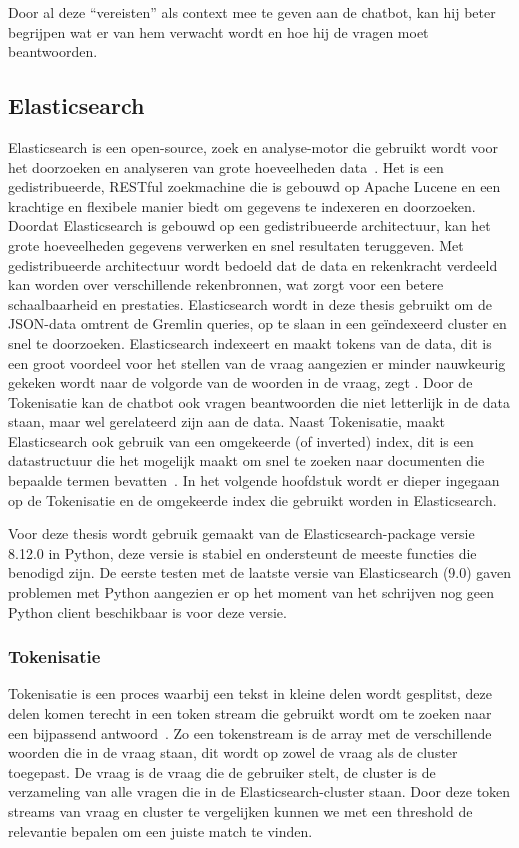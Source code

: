 Door al deze ``vereisten'' als context mee te geven aan de chatbot, kan hij beter begrijpen wat er van hem verwacht wordt en hoe hij de vragen moet beantwoorden.

\subsection{Elasticsearch}\label{sec:Elasticsearch}
Elasticsearch is een open-source, zoek en analyse-motor die gebruikt wordt voor het doorzoeken en analyseren van grote hoeveelheden data~\autocite{Elastic2025}.
Het is een gedistribueerde, RESTful zoekmachine die is gebouwd op Apache Lucene en een krachtige en flexibele manier biedt om gegevens te indexeren en doorzoeken.
Doordat Elasticsearch is gebouwd op een gedistribueerde architectuur, kan het grote hoeveelheden gegevens verwerken en snel resultaten teruggeven.
Met gedistribueerde architectuur wordt bedoeld dat de data en rekenkracht verdeeld kan worden over verschillende rekenbronnen, wat zorgt voor een betere schaalbaarheid en prestaties.
Elasticsearch wordt in deze thesis gebruikt om de JSON-data omtrent de Gremlin queries, op te slaan in een geïndexeerd cluster en snel te doorzoeken.
Elasticsearch indexeert en maakt tokens van de data, dit is een groot voordeel voor het stellen van de vraag aangezien er minder nauwkeurig gekeken wordt naar de volgorde van de woorden in de vraag, zegt \textcite{Oers2025}.
Door de Tokenisatie kan de chatbot ook vragen beantwoorden die niet letterlijk in de data staan, maar wel gerelateerd zijn aan de data.
Naast Tokenisatie, maakt Elasticsearch ook gebruik van een omgekeerde (of inverted) index, dit is een datastructuur die het mogelijk maakt om snel te zoeken naar documenten die bepaalde termen bevatten~\autocite{Brimley2023}.
In het volgende hoofdstuk wordt er dieper ingegaan op de Tokenisatie en de omgekeerde index die gebruikt worden in Elasticsearch.

Voor deze thesis wordt gebruik gemaakt van de Elasticsearch-package versie 8.12.0 in Python, deze versie is stabiel en ondersteunt de meeste functies die benodigd zijn.
De eerste testen met de laatste versie van Elasticsearch (9.0) gaven problemen met Python aangezien er op het moment van het schrijven nog geen Python client beschikbaar is voor deze versie.

\subsubsection{Tokenisatie}
Tokenisatie is een proces waarbij een tekst in kleine delen wordt gesplitst, deze delen komen terecht in een token stream die gebruikt wordt om te zoeken naar een bijpassend antwoord~\autocite{Elastic}.
Zo een tokenstream is de array met de verschillende woorden die in de vraag staan, dit wordt op zowel de vraag als de cluster toegepast.
De vraag is de vraag die de gebruiker stelt, de cluster is de verzameling van alle vragen die in de Elasticsearch-cluster staan.
Door deze token streams van vraag en cluster te vergelijken kunnen we met een threshold de relevantie bepalen om een juiste match te vinden.

